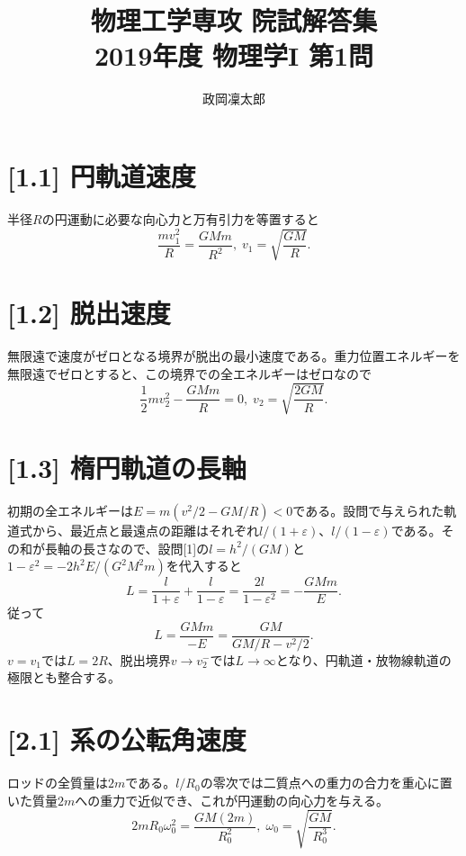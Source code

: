\documentclass[11pt,a4paper]{article}
\title{物理工学専攻 院試解答集\\2019年度 物理学I 第1問}
\author{政岡凜太郎}
\date{}
\begin{document}
\maketitle

\section*{[1.1] 円軌道速度}
半径$R$の円運動に必要な向心力と万有引力を等置すると
\begin{equation}
 \frac{mv_1^2}{R}=\frac{GMm}{R^2},\;
 \boxed{v_1=\sqrt{\frac{GM}{R}}}.
\end{equation}

\section*{[1.2] 脱出速度}
無限遠で速度がゼロとなる境界が脱出の最小速度である。重力位置エネルギーを無限遠でゼロとすると、この境界での全エネルギーはゼロなので
\begin{equation}
 \frac12mv_2^2-\frac{GMm}{R}=0,\;
 \boxed{v_2=\sqrt{\frac{2GM}{R}}}.
\end{equation}

\section*{[1.3] 楕円軌道の長軸}
初期の全エネルギーは$E=m(v^2/2-GM/R)<0$である。設問で与えられた軌道式から、最近点と最遠点の距離はそれぞれ$l/(1+\varepsilon)$、$l/(1-\varepsilon)$である。その和が長軸の長さなので、設問[1]の$l=h^2/(GM)$と$1-\varepsilon^2=-2h^2E/(G^2M^2m)$を代入すると
\begin{equation}
 L=\frac{l}{1+\varepsilon}+\frac{l}{1-\varepsilon}
 =\frac{2l}{1-\varepsilon^2}=-\frac{GMm}{E}.
\end{equation}
従って
\begin{equation}
 \boxed{L=\frac{GMm}{-E}
 =\frac{GM}{GM/R-v^2/2}}.
\end{equation}
$v=v_1$では$L=2R$、脱出境界$v\to v_2^-$では$L\to\infty$となり、円軌道・放物線軌道の極限とも整合する。

\section*{[2.1] 系の公転角速度}
ロッドの全質量は$2m$である。$l/R_0$の零次では二質点への重力の合力を重心に置いた質量$2m$への重力で近似でき、これが円運動の向心力を与える。
\begin{equation}
 2mR_0\omega_0^2=\frac{GM(2m)}{R_0^2},\;
 \boxed{\omega_0=\sqrt{\frac{GM}{R_0^3}}}.
\end{equation}
\end{document}
